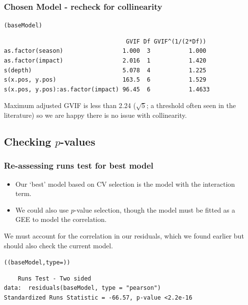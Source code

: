 \begin{frame}[fragile]
\frametitle{Chosen Model - recheck for collinearity}
\begin{knitrout}\footnotesize
{}\color{fgcolor}\begin{kframe}
\begin{alltt}
(baseModel)
\end{alltt}
\begin{verbatim}
                                   GVIF Df GVIF^(1/(2*Df))
as.factor(season)                 1.000  3           1.000
as.factor(impact)                 2.016  1           1.420
s(depth)                          5.078  4           1.225
s(x.pos, y.pos)                   163.5  6           1.529
s(x.pos, y.pos):as.factor(impact) 96.45  6           1.4633
\end{verbatim}
\end{kframe}
\end{knitrout}
\begin{block}{}
Maximum adjusted GVIF is less than 2.24 ($\sqrt{5}$; a threshold often seen in the literature) so we are happy there is no issue with collinearity.
\end{block}
\end{frame}


\subsection{Checking $p$-values}

\begin{frame}[fragile]
\frametitle{Re-assessing runs test for best model}
\begin{itemize}
\item Our `best' model based on CV selection is the model with the interaction term. 
\item We could also use $p$-value selection, though the model must be fitted as a GEE to model the correlation.
\end{itemize}

We must account for the correlation in our residuals, which we found earlier but should also check the current model.
\begin{knitrout}\footnotesize
{}\color{fgcolor}\begin{kframe}
\begin{alltt}
((baseModel, type = ))
\end{alltt}
\begin{verbatim}
	Runs Test - Two sided
data:  residuals(baseModel, type = "pearson") 
Standardized Runs Statistic = -66.57, p-value <2.2e-16
\end{verbatim}
\end{kframe}
\end{knitrout}


\end{frame}

